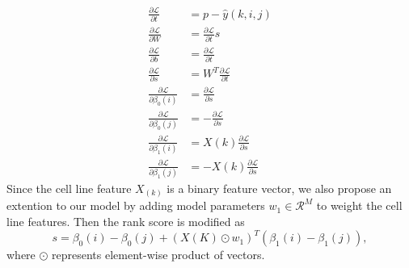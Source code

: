 \begin{align*}
\frac{\partial \mathcal{L}}{\partial t} &= p - \hat{y}(k,i,j) \\
\frac{\partial \mathcal{L}}{\partial W} &= \frac{\partial \mathcal{L}}{\partial t} s\\
\frac{\partial \mathcal{L}}{\partial b} &= \frac{\partial \mathcal{L}}{\partial t} \\
\frac{\partial \mathcal{L}}{\partial s} &= W^T \frac{\partial \mathcal{L}}{\partial t} \\
\frac{\partial \mathcal{L}}{\partial \beta_0(i)} &= \frac{\partial \mathcal{L}}{\partial s} \\
\frac{\partial \mathcal{L}}{\partial \beta_0(j)} &= -\frac{\partial \mathcal{L}}{\partial s} \\
\frac{\partial \mathcal{L}}{\partial \beta_1(i)} &=  X(k) \frac{\partial \mathcal{L}}{\partial s} \\
\frac{\partial \mathcal{L}}{\partial \beta_1(j)} &=  -X(k) \frac{\partial \mathcal{L}}{\partial s}
\end{align*}
Since the cell line feature $X_(k)$ is a binary feature vector, we also propose an extention to our model by adding model parameters $w_1 \in \mathcal{R}^ M$ to weight the cell line features. Then the rank score is modified as 
\begin{equation}
s = \beta_0(i) - \beta_0(j) + (X(K) \odot w_1)^T (\beta_1(i) - \beta_1(j)),
\end{equation}
where $\odot$ represents element-wise product of vectors.